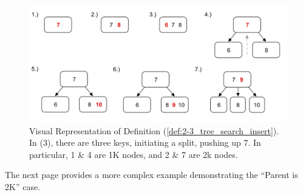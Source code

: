 \vspace{-1em}
\begin{figure}[ht!]
    \begin{center}
    \includegraphics[width=\textwidth]{./Sections/graphs/search/2_3_insert.png}
    \end{center}
     \caption{Visual Representation of Definition (\ref{def:2-3_tree_search_insert}). In (3),
     there are three keys, initiating a split, pushing up 7. In particular, 1 \& 4 are 1K nodes, and 2 \& 7 are 2k nodes.}\label{fig:2-3_tree_insert}
  \end{figure}

\noindent
The next page provides a more complex example demonstrating the ``Parent is 2K'' case.
\newpage 

